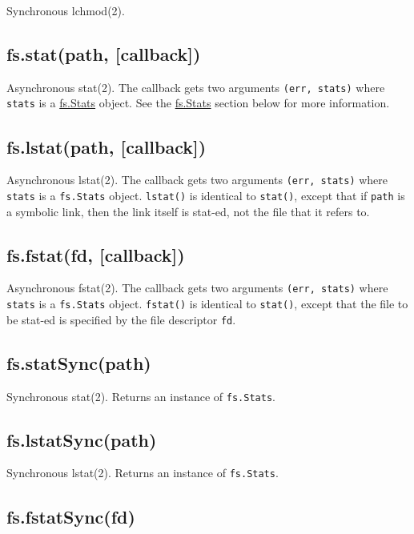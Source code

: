 Synchronous lchmod(2).

\subsection{fs.stat(path, {[}callback{]})}

Asynchronous stat(2). The callback gets two arguments
\texttt{(err, stats)} where \texttt{stats} is a
\hyperref[fs_class_fs_stats]{fs.Stats} object. See the
\hyperref[fs_class_fs_stats]{fs.Stats} section below for more
information.

\subsection{fs.lstat(path, {[}callback{]})}

Asynchronous lstat(2). The callback gets two arguments
\texttt{(err, stats)} where \texttt{stats} is a \texttt{fs.Stats}
object. \texttt{lstat()} is identical to \texttt{stat()}, except that if
\texttt{path} is a symbolic link, then the link itself is stat-ed, not
the file that it refers to.

\subsection{fs.fstat(fd, {[}callback{]})}

Asynchronous fstat(2). The callback gets two arguments
\texttt{(err, stats)} where \texttt{stats} is a \texttt{fs.Stats}
object. \texttt{fstat()} is identical to \texttt{stat()}, except that
the file to be stat-ed is specified by the file descriptor \texttt{fd}.

\subsection{fs.statSync(path)}

Synchronous stat(2). Returns an instance of \texttt{fs.Stats}.

\subsection{fs.lstatSync(path)}

Synchronous lstat(2). Returns an instance of \texttt{fs.Stats}.

\subsection{fs.fstatSync(fd)}

